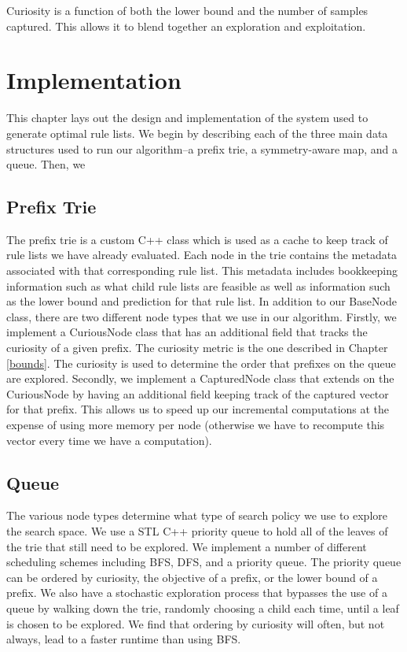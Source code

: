 \documentclass[]{article}
\begin{document}
Curiosity is a function of both the lower bound and the number of samples captured.
This allows it to blend together an exploration and exploitation.

\section{Implementation}

This chapter lays out the design and implementation of the system used to generate optimal rule lists. 
We begin by describing each of the three main data structures used to run our algorithm--a prefix trie, a symmetry-aware map, and a queue. 
Then, we 

\subsection{Prefix Trie}
The prefix trie is a custom C++ class which is used as a cache to keep track of rule lists we have already evaluated. 
Each node in the trie contains the metadata associated with that corresponding rule list. 
This metadata includes bookkeeping information such as what child rule lists are feasible as well as information such as the lower bound and prediction for that rule list.
In addition to our BaseNode class, there are two different node types that we use in our algorithm.
Firstly, we implement a CuriousNode class that has an additional field that tracks the curiosity of a given prefix.
The curiosity metric is the one described in Chapter \ref{bounds}.
The curiosity is used to determine the order that prefixes on the queue are explored.
Secondly, we implement a CapturedNode class that extends on the CuriousNode by having an additional field keeping track of the captured vector for that prefix.
This allows us to speed up our incremental computations at the expense of using more memory per node (otherwise we have to recompute this vector every time we have a computation).

\subsection{Queue}
The various node types determine what type of search policy we use to explore the search space.
We use a STL C++ priority queue to hold all of the leaves of the trie that still need to be explored.
We implement a number of different scheduling schemes including BFS, DFS, and a priority queue.
The priority queue can be ordered by curiosity, the objective of a prefix, or the lower bound of a prefix.
We also have a stochastic exploration process that bypasses the use of a queue by walking down the trie, randomly choosing a child each time, until a leaf is chosen to be explored.
We find that ordering by curiosity will often, but not always, lead to a faster runtime than using BFS.
\end{document}
